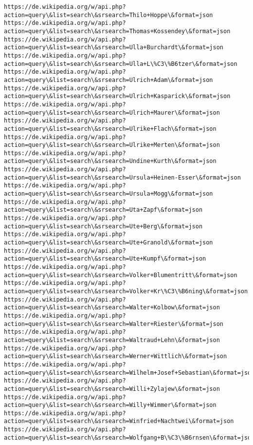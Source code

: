 \documentclass[11pt]{article}
\begin{document}
\begin{Verbatim}[commandchars=\\\{\}]
https://de.wikipedia.org/w/api.php?action=query\&list=search\&srsearch=Thilo+Hoppe\&format=json
https://de.wikipedia.org/w/api.php?action=query\&list=search\&srsearch=Thomas+Kossendey\&format=json
https://de.wikipedia.org/w/api.php?action=query\&list=search\&srsearch=Ulla+Burchardt\&format=json
https://de.wikipedia.org/w/api.php?action=query\&list=search\&srsearch=Ulla+L\%C3\%B6tzer\&format=json
https://de.wikipedia.org/w/api.php?action=query\&list=search\&srsearch=Ulrich+Adam\&format=json
https://de.wikipedia.org/w/api.php?action=query\&list=search\&srsearch=Ulrich+Kasparick\&format=json
https://de.wikipedia.org/w/api.php?action=query\&list=search\&srsearch=Ulrich+Maurer\&format=json
https://de.wikipedia.org/w/api.php?action=query\&list=search\&srsearch=Ulrike+Flach\&format=json
https://de.wikipedia.org/w/api.php?action=query\&list=search\&srsearch=Ulrike+Merten\&format=json
https://de.wikipedia.org/w/api.php?action=query\&list=search\&srsearch=Undine+Kurth\&format=json
https://de.wikipedia.org/w/api.php?action=query\&list=search\&srsearch=Ursula+Heinen-Esser\&format=json
https://de.wikipedia.org/w/api.php?action=query\&list=search\&srsearch=Ursula+Mogg\&format=json
https://de.wikipedia.org/w/api.php?action=query\&list=search\&srsearch=Uta+Zapf\&format=json
https://de.wikipedia.org/w/api.php?action=query\&list=search\&srsearch=Ute+Berg\&format=json
https://de.wikipedia.org/w/api.php?action=query\&list=search\&srsearch=Ute+Granold\&format=json
https://de.wikipedia.org/w/api.php?action=query\&list=search\&srsearch=Ute+Kumpf\&format=json
https://de.wikipedia.org/w/api.php?action=query\&list=search\&srsearch=Volker+Blumentritt\&format=json
https://de.wikipedia.org/w/api.php?action=query\&list=search\&srsearch=Volker+Kr\%C3\%B6ning\&format=json
https://de.wikipedia.org/w/api.php?action=query\&list=search\&srsearch=Walter+Kolbow\&format=json
https://de.wikipedia.org/w/api.php?action=query\&list=search\&srsearch=Walter+Riester\&format=json
https://de.wikipedia.org/w/api.php?action=query\&list=search\&srsearch=Waltraud+Lehn\&format=json
https://de.wikipedia.org/w/api.php?action=query\&list=search\&srsearch=Werner+Wittlich\&format=json
https://de.wikipedia.org/w/api.php?action=query\&list=search\&srsearch=Wilhelm+Josef+Sebastian\&format=json
https://de.wikipedia.org/w/api.php?action=query\&list=search\&srsearch=Willi+Zylajew\&format=json
https://de.wikipedia.org/w/api.php?action=query\&list=search\&srsearch=Willy+Wimmer\&format=json
https://de.wikipedia.org/w/api.php?action=query\&list=search\&srsearch=Winfried+Nachtwei\&format=json
https://de.wikipedia.org/w/api.php?action=query\&list=search\&srsearch=Wolfgang+B\%C3\%B6rnsen\&format=json

\end{Verbatim}
\end{document}
